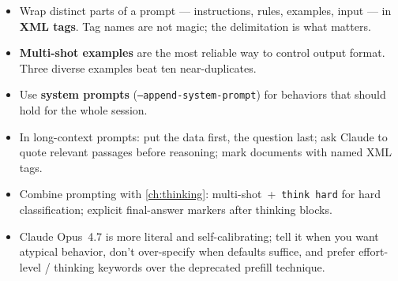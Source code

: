 \begin{summarybox}
\begin{itemize}
  \item Wrap distinct parts of a prompt — instructions, rules, examples,
        input — in \textbf{XML tags}. Tag names are not magic; the
        delimitation is what matters.
  \item \textbf{Multi-shot examples} are the most reliable way to
        control output format. Three diverse examples beat ten
        near-duplicates.
  \item Use \textbf{system prompts} (\texttt{--append-system-prompt})
        for behaviors that should hold for the whole session.
  \item In long-context prompts: put the data first, the question last;
        ask Claude to quote relevant passages before reasoning; mark
        documents with named XML tags.
  \item Combine prompting with \cref{ch:thinking}: multi-shot~+~\texttt{think hard}
        for hard classification; explicit final-answer markers after
        thinking blocks.
  \item Claude Opus~4.7 is more literal and self-calibrating; tell it
        when you want atypical behavior, don't over-specify when defaults
        suffice, and prefer effort-level / thinking keywords over the
        deprecated prefill technique.
\end{itemize}
\end{summarybox}

\nocite{*}
\printbibliography[heading=subbibliography,title={References}]
